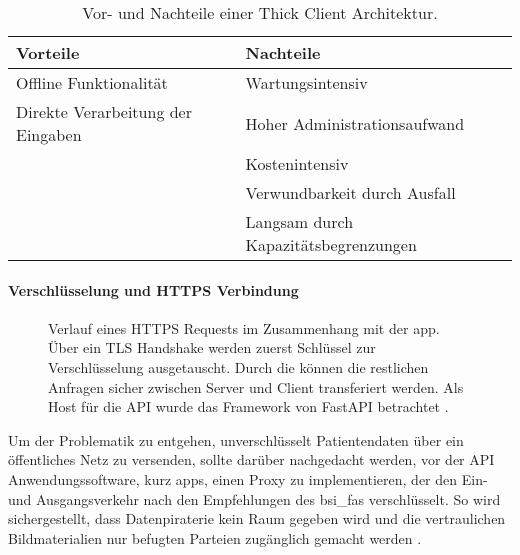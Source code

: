 \begin{table}[t]\vspace{1ex}\centering
  \begin{tabular*}{14cm}{l|l}
  \textbf{Vorteile} & \textbf{Nachteile}
  \\\hline\hline
  Offline Funktionalität             &  Wartungsintensiv               \\
  Direkte Verarbeitung der Eingaben  &  Hoher Administrationsaufwand   \\
                                     &  Kostenintensiv                 \\
                                     &  Verwundbarkeit durch Ausfall   \\
                                     &  Langsam durch Kapazitätsbegrenzungen
  \\\hline
  \end{tabular*}
  \caption[Vor- und Nachteile von Thick Client]{Vor- und Nachteile einer Thick Client Architektur.}\label{cap:thickclient}
\vspace{1ex}\end{table}\label{table:thickclient}


\paragraph{Verschlüsselung und HTTPS Verbindung}\label{encryption}
\begin{figure}[t]
\begin{center}
 
\caption[Verlauf eines HTTPS Requests im Zusammenhang mit der \ac{app}]{Verlauf eines HTTPS Requests im Zusammenhang mit der \ac{app}. Über ein TLS Handshake werden zuerst Schlüssel zur Verschlüsselung ausgetauscht. Durch die können die restlichen Anfragen sicher zwischen Server und Client transferiert werden. Als Host für die API wurde das Framework von FastAPI betrachtet \cite{fastapi}.}\label{cap:fastapi}
\end{center}
\end{figure}\label{fig:fastapi}

Um der Problematik zu entgehen, unverschlüsselt Patientendaten über ein öffentliches Netz zu versenden, sollte darüber nachgedacht werden, vor der API Anwendungssoftware, kurz \Acp{app}, einen Proxy zu implementieren, der den Ein- und Ausgangsverkehr nach den Empfehlungen des \Acp{bsi_fa} verschlüsselt. So wird sichergestellt, dass Datenpiraterie kein Raum gegeben wird und die vertraulichen Bildmaterialien nur befugten Parteien zugänglich gemacht werden \cite{fastapi}\cite{bsi}.


